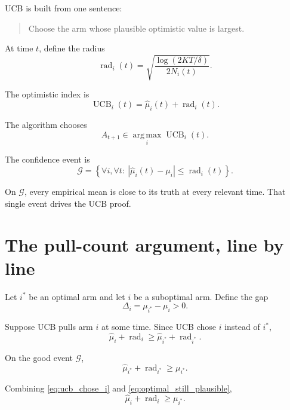 \documentclass[en,nofont,11pt]{elegantbook}
\newcommand{\argmax}{\operatorname*{arg\,max}}
\begin{document}
UCB is built from one sentence:

\begin{quote}
Choose the arm whose plausible optimistic value is largest.
\end{quote}

At time $t$, define the radius
\begin{equation}
\operatorname{rad}_i(t)
=\sqrt{\frac{\log(2KT/\delta)}{2N_i(t)}}.
\end{equation}

The optimistic index is
\begin{equation}
\operatorname{UCB}_i(t)
=\widehat\mu_i(t)+\operatorname{rad}_i(t).
\end{equation}

The algorithm chooses
\begin{equation}
A_{t+1}\in \argmax_i \operatorname{UCB}_i(t).
\end{equation}

The confidence event is
\begin{equation}
\mathcal{G}=
\left\{
\forall i,\forall t:\ |
\widehat\mu_i(t)-\mu_i|
\leq \operatorname{rad}_i(t)
\right\}. \label{eq:good_event}
\end{equation}

On $\mathcal{G}$, every empirical mean is close to its truth at every relevant time.  That single event drives the UCB proof.

\section{The pull-count argument, line by line}

Let $i^*$ be an optimal arm and let $i$ be a suboptimal arm.  Define the gap
\begin{equation}
\Delta_i=\mu_{i^*}-\mu_i>0.
\end{equation}

Suppose UCB pulls arm $i$ at some time.  Since UCB chose $i$ instead of $i^*$,
\begin{equation}
\widehat\mu_i + \operatorname{rad}_i
\geq
\widehat\mu_{i^*}+\operatorname{rad}_{i^*}. \label{eq:ucb_chose_i}
\end{equation}

On the good event $\mathcal{G}$,
\begin{equation}
\widehat\mu_{i^*}+\operatorname{rad}_{i^*}
\geq \mu_{i^*}. \label{eq:optimal_still_plausible}
\end{equation}

Combining \eqref{eq:ucb_chose_i} and \eqref{eq:optimal_still_plausible},
\begin{equation}
\widehat\mu_i + \operatorname{rad}_i
\geq \mu_{i^*}. \label{eq:chosen_index_above_opt}
\end{equation}
\end{document}
